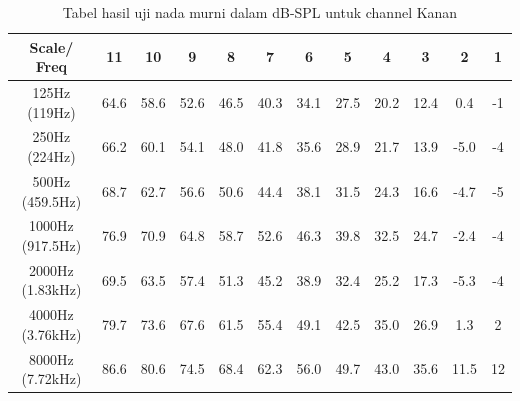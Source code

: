 \documentclass{article}
\begin{document}
	\begin{table}[H]
		\renewcommand{\tablename}{Tabel}
		\caption{Tabel hasil uji nada murni dalam dB-SPL untuk channel Kanan}
		\centering
		\begin{tabular}{|c|c|c|c|c|c|c|c|c|c|c|c|}
			\hline
			Scale/ Freq & 11 & 10 & 9 & 8 & 7 & 6 & 5 & 4 & 3 & 2 & 1\\ [0.5ex]
			\hline\hline
			125Hz (119Hz) & 64.6 & 58.6 & 52.6  & 46.5 & 40.3 & 34.1 & 27.5 & 20.2 & 12.4 & 0.4 & -1 \\
			250Hz (224Hz) & 66.2 & 60.1 & 54.1  & 48.0 & 41.8 & 35.6 & 28.9 & 21.7 & 13.9 & -5.0 & -4 \\
			500Hz (459.5Hz) & 68.7 & 62.7 & 56.6  & 50.6 & 44.4 & 38.1 & 31.5 & 24.3 & 16.6 & -4.7 & -5 \\
			1000Hz (917.5Hz) & 76.9 & 70.9 & 64.8  & 58.7 & 52.6 & 46.3 & 39.8 & 32.5 & 24.7 & -2.4 & -4 \\
			2000Hz (1.83kHz) & 69.5 & 63.5 & 57.4  & 51.3 & 45.2 & 38.9 & 32.4 & 25.2 & 17.3 & -5.3 & -4 \\
			4000Hz (3.76kHz) & 79.7 & 73.6 & 67.6  & 61.5 & 55.4 & 49.1 & 42.5 & 35.0 & 26.9 & 1.3 & 2 \\
			8000Hz (7.72kHz) & 86.6 & 80.6 & 74.5  & 68.4 & 62.3 & 56.0 & 49.7 & 43.0 & 35.6 & 11.5 & 12 \\
			\hline
		\end{tabular}
	\end{table}
\end{document}
